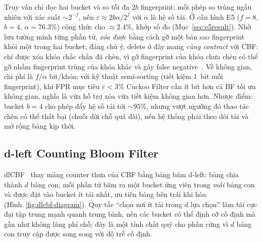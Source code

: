 \documentclass[11pt,a4paper]{article}
\begin{document}
Truy vấn chỉ đọc hai bucket và so tối đa $2b$ fingerprint; mỗi phép so
trùng ngẫu nhiên với xác suất ${\sim}2^{-f}$, nên
$\varepsilon \approx 2b\alpha/2^{f}$ với $\alpha$ là hệ số tải. Ở cấu hình
E5 ($f=8$, $b=4$, $\alpha=76.3\%$) công thức cho ${\approx}2.4\%$, khớp số
đo \CkFpr{} (Mục~\ref{sec:e5result}). Nhờ lưu tường minh từng phần tử,
\emph{xóa được} bằng cách gỡ một bản sao fingerprint khỏi một trong hai
bucket; đáng chú ý, delete ở đây mang \emph{cùng contract} với CBF: chỉ
được xóa khóa chắc chắn đã chèn, vì gỡ fingerprint của khóa chưa chèn có
thể gỡ nhầm fingerprint trùng của khóa khác và gây false
negative~\cite{cuckoo2014}. Về không gian, chi phí là $f/\alpha$
bit/khóa; với kỹ thuật semi-sorting (tiết kiệm 1~bit mỗi fingerprint), khi
FPR mục tiêu $\varepsilon<3\%$ Cuckoo Filter cần ít bit hơn cả BF tối ưu
không gian, nghĩa là vừa hỗ trợ xóa vừa tiết kiệm không gian hơn. Nhược điểm:
bucket $b=4$ cho phép đẩy hệ số tải tới ${\sim}95\%$, nhưng vượt ngưỡng đó
thao tác chèn có thể thất bại (chuỗi dời chỗ quá dài), nên hệ thống phải
theo dõi tải và mở rộng bảng kịp thời.

\subsection{d-left Counting Bloom Filter}
dlCBF~\cite{bonomi2006} thay mảng counter thưa của CBF bằng bảng băm
d-left: bảng chia thành $d$ bảng con, mỗi phần tử băm ra một bucket ứng
viên trong \emph{mỗi} bảng con và được đặt vào bucket ít tải nhất, ưu tiên
bảng bên trái khi hòa (Hình~\ref{fig:dlcbf-diagram}). Quy tắc ``chọn nơi
ít tải trong $d$ lựa chọn'' làm tải cực đại tập trung mạnh quanh trung
bình, nên các bucket có thể định cỡ cố định mà gần như không lãng phí chỗ;
đây là một tính chất quý cho phần cứng vì $d$ bảng con truy cập được song
song với độ trễ cố định.
\end{document}
